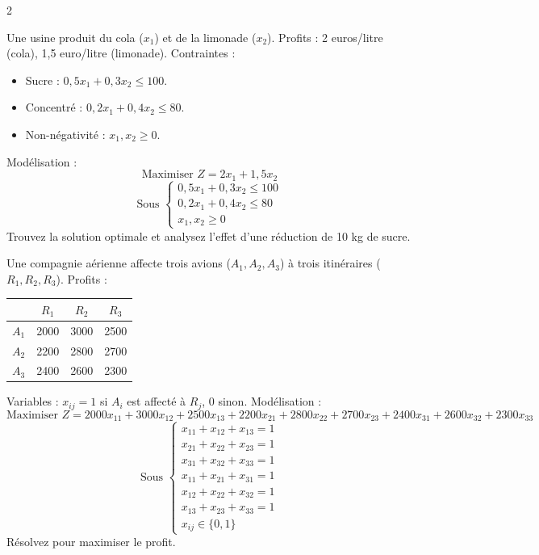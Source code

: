\begin{multicols}{2}
\begin{exo}
	Une usine produit du cola (\(x_1\)) et de la limonade (\(x_2\)). Profits : 2 euros/litre (cola), 1,5 euro/litre (limonade). Contraintes :
	\begin{itemize}
		\item Sucre : \(0,5x_1 + 0,3x_2 \leq 100\).
		\item Concentré : \(0,2x_1 + 0,4x_2 \leq 80\).
		\item Non-négativité : \(x_1, x_2 \geq 0\).
	\end{itemize}
	Modélisation :
	\[
	\text{Maximiser } Z = 2x_1 + 1,5x_2
	\]
	\[
	\text{Sous } \begin{cases}
	0,5x_1 + 0,3x_2 \leq 100 \\
	0,2x_1 + 0,4x_2 \leq 80 \\
	x_1, x_2 \geq 0
	\end{cases}
	\]
	Trouvez la solution optimale et analysez l'effet d'une réduction de 10 kg de sucre.
\end{exo}

\begin{exo}
	Une compagnie aérienne affecte trois avions (\(A_1, A_2, A_3\)) à trois itinéraires (\(R_1, R_2, R_3\)). Profits :
	\begin{center}
		\begin{tabular}{c|ccc}
			& \(R_1\) & \(R_2\) & \(R_3\) \\
			\hline
			\(A_1\) & 2000 & 3000 & 2500 \\
			\(A_2\) & 2200 & 2800 & 2700 \\
			\(A_3\) & 2400 & 2600 & 2300 \\
		\end{tabular}
	\end{center}
	Variables : \(x_{ij} = 1\) si \(A_i\) est affecté à \(R_j\), 0 sinon.
	Modélisation :
	\[
	\text{Maximiser } Z = 2000x_{11} + 3000x_{12} + 2500x_{13} + 2200x_{21} + 2800x_{22} + 2700x_{23} + 2400x_{31} + 2600x_{32} + 2300x_{33}
	\]
	\[
	\text{Sous } \begin{cases}
	x_{11} + x_{12} + x_{13} = 1 \\
	x_{21} + x_{22} + x_{23} = 1 \\
	x_{31} + x_{32} + x_{33} = 1 \\
	x_{11} + x_{21} + x_{31} = 1 \\
	x_{12} + x_{22} + x_{32} = 1 \\
	x_{13} + x_{23} + x_{33} = 1 \\
	x_{ij} \in \{0,1\}
	\end{cases}
	\]
	Résolvez pour maximiser le profit.
\end{exo}


\end{multicols}
